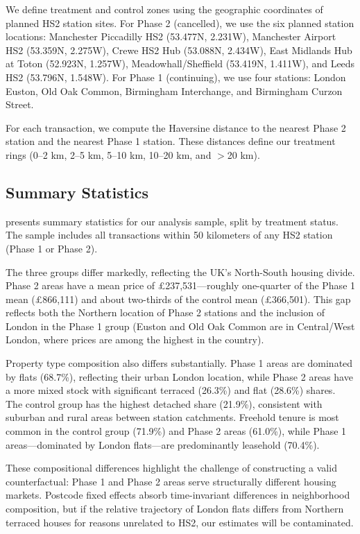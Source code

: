 \documentclass[12pt]{article}
\begin{document}
We define treatment and control zones using the geographic coordinates of planned HS2 station sites. For Phase 2 (cancelled), we use the six planned station locations: Manchester Piccadilly HS2 (53.477\textdegree N, 2.231\textdegree W), Manchester Airport HS2 (53.359\textdegree N, 2.275\textdegree W), Crewe HS2 Hub (53.088\textdegree N, 2.434\textdegree W), East Midlands Hub at Toton (52.923\textdegree N, 1.257\textdegree W), Meadowhall/Sheffield (53.419\textdegree N, 1.411\textdegree W), and Leeds HS2 (53.796\textdegree N, 1.548\textdegree W). For Phase 1 (continuing), we use four stations: London Euston, Old Oak Common, Birmingham Interchange, and Birmingham Curzon Street.

For each transaction, we compute the Haversine distance to the nearest Phase 2 station and the nearest Phase 1 station. These distances define our treatment rings (0--2 km, 2--5 km, 5--10 km, 10--20 km, and $>$20 km).

\subsection{Summary Statistics}

 presents summary statistics for our analysis sample, split by treatment status. The sample includes all transactions within 50 kilometers of any HS2 station (Phase 1 or Phase 2).

The three groups differ markedly, reflecting the UK's North-South housing divide. Phase 2 areas have a mean price of \pounds 237,531---roughly one-quarter of the Phase 1 mean (\pounds 866,111) and about two-thirds of the control mean (\pounds 366,501). This gap reflects both the Northern location of Phase 2 stations and the inclusion of London in the Phase 1 group (Euston and Old Oak Common are in Central/West London, where prices are among the highest in the country).

Property type composition also differs substantially. Phase 1 areas are dominated by flats (68.7\%), reflecting their urban London location, while Phase 2 areas have a more mixed stock with significant terraced (26.3\%) and flat (28.6\%) shares. The control group has the highest detached share (21.9\%), consistent with suburban and rural areas between station catchments. Freehold tenure is most common in the control group (71.9\%) and Phase 2 areas (61.0\%), while Phase 1 areas---dominated by London flats---are predominantly leasehold (70.4\%).

These compositional differences highlight the challenge of constructing a valid counterfactual: Phase 1 and Phase 2 areas serve structurally different housing markets. Postcode fixed effects absorb time-invariant differences in neighborhood composition, but if the relative trajectory of London flats differs from Northern terraced houses for reasons unrelated to HS2, our estimates will be contaminated.
\end{document}
